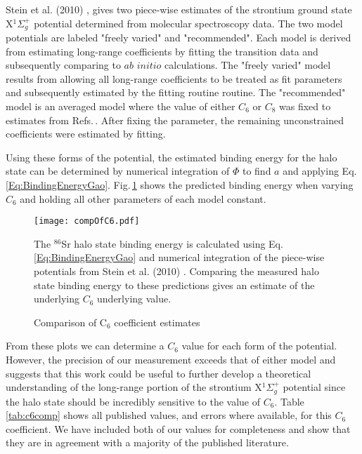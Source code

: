 Stein et al. (2010) \cite{Stein2010}, gives two piece-wise estimates of the strontium ground state X$^1\Sigma_g^+$ potential determined from molecular spectroscopy data.
The two model potentials are labeled "freely varied" and "recommended".
Each model is derived from estimating long-range coefficients by fitting the transition data and subsequently comparing to $\textit{ab initio}$ calculations.
The "freely varied" model results from allowing all long-range coefficients to be treated as fit parameters and subsequently estimated by the fitting routine routine.
The "recommended" model is an averaged model where the value of either $C_6$ or $C_8$ was fixed to estimates from Refs.\,\cite{Porsev2006, ykt06}.
After fixing the parameter, the remaining unconstrained coefficients were estimated by fitting.

Using these forms of the potential, the estimated binding energy for the halo state can be determined by numerical integration of $\Phi$ to find $a$ and applying Eq.\,\ref{Eq:BindingEnergyGao}.
Fig.\,\ref{fig:c6estimates} shows the predicted binding energy when varying $C_6$ and holding all other parameters of each model constant.
	\begin{figure} 
	\centerline{
	  \texttt{[image: compOfC6.pdf]}}
	  \caption{Comparison of C$_6$ coefficient estimates}{The $^{86}$Sr halo state binding energy is calculated using Eq.\,\ref{Eq:BindingEnergyGao} and numerical integration of the piece-wise potentials from Stein et al. (2010) \cite{Stein2010}. Comparing the measured halo state binding energy to these predictions gives an estimate of the underlying $C_6$ underlying value.}
	  \label{fig:c6estimates}
	\end{figure}
From these plots we can determine a $C_6$ value for each form of the potential.
However, the precision of our measurement exceeds that of either model and suggests that this work could be useful to further develop a theoretical understanding of the long-range portion of the strontium X$^1\Sigma_g^+$ potential since the halo state should be incredibly sensitive to the value of $C_6$.
Table \ref{tab:c6comp} shows all published values, and errors where available, for this $C_6$ coefficient.
We have included both of our values for completeness and show that they are in agreement with a majority of the published literature.
